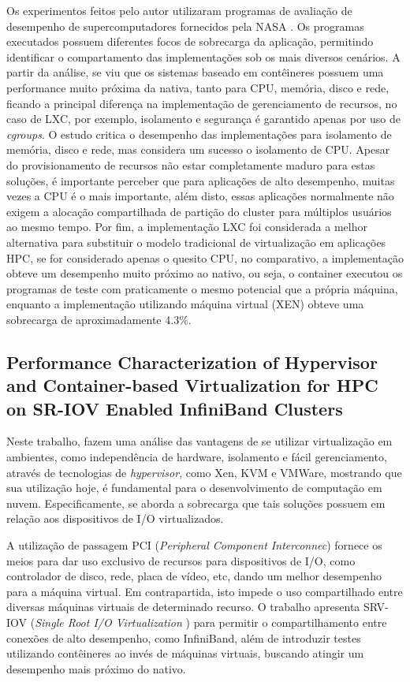 \documentclass[twoside,english,brazilian]{UNISINOSartigo}
\begin{document}
\begin{itemize}
Os experimentos feitos pelo autor utilizaram programas de avaliação de desempenho de supercomputadores fornecidos pela NASA \cite{NASA2016}. Os programas executados possuem diferentes focos de sobrecarga da aplicação, permitindo identificar o compartamento das implementações sob os mais diversos cenários. A partir da análise, se viu que os sistemas baseado em contêineres possuem uma performance muito próxima da nativa, tanto para CPU, memória, disco e rede, ficando a principal diferença na implementação de gerenciamento de recursos, no caso de  LXC, por exemplo, isolamento e segurança é garantido apenas por uso de \textit{cgroups}. O estudo critica o desempenho das implementações para isolamento de memória, disco e rede, mas considera um sucesso o isolamento de CPU. Apesar do provisionamento de recursos não estar completamente maduro para estas soluções, é importante perceber que para aplicações de alto desempenho, muitas vezes a CPU é o mais importante, além disto, essas aplicações normalmente não exigem a alocação compartilhada de partição do cluster para múltiplos usuários ao mesmo tempo. Por fim, a implementação LXC foi considerada a melhor alternativa para substituir o modelo tradicional de virtualização em aplicações HPC, se for considerado apenas o quesito CPU, no comparativo, a implementação obteve um desempenho muito próximo ao nativo, ou seja, o container executou os programas de teste com praticamente o mesmo potencial que a própria máquina, enquanto a implementação utilizando máquina virtual (XEN) obteve uma sobrecarga de aproximadamente 4.3\%.

\subsection{Performance Characterization of Hypervisor and Container-based Virtualization for HPC on SR-IOV Enabled InfiniBand Clusters}
\label{trabdocker4}

Neste trabalho,  fazem uma análise das vantagens de se utilizar virtualização em ambientes, como independência de hardware, isolamento e fácil gerenciamento, através de tecnologias de \textit{hypervisor}, como Xen, KVM e VMWare, mostrando que sua utilização hoje, é fundamental para o desenvolvimento de computação em nuvem. Especificamente, se aborda a sobrecarga que tais soluções possuem em relação aos dispositivos de I/O virtualizados.

A utilização de passagem PCI (\textit{Peripheral Component Interconnec}) fornece os meios para dar uso exclusivo de recursos para dispositivos de I/O, como controlador de disco, rede, placa de vídeo, etc, dando um melhor desempenho para a máquina virtual. Em contrapartida, isto impede o uso compartilhado entre diversas máquinas virtuais de determinado recurso. O trabalho apresenta SRV-IOV (\textit{Single Root I/O Virtualization }) para permitir o compartilhamento entre conexões de alto desempenho, como InfiniBand, além de introduzir testes utilizando contêineres ao invés de máquinas virtuais, buscando atingir um desempenho mais próximo do nativo.


\end{itemize}
\end{document}
